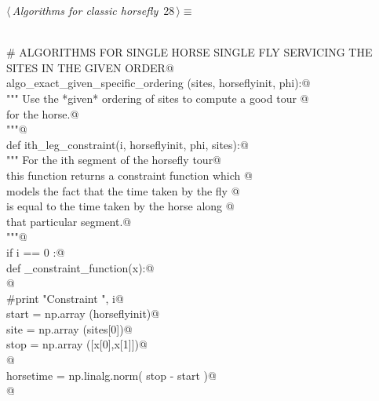 \documentclass[11.5pt]{report}
\begin{document}
\newchunk 

\begin{flushleft} \small\label{scrap32}\raggedright\small
{} $\langle\,${\itshape Algorithms for classic horsefly}\nobreak\ {\footnotesize {28}}$\,\rangle\equiv$
\vspace{-1ex}
\begin{list}{}{} \item
\mbox{}\verb@@\\
\mbox{}\verb@# ALGORITHMS FOR SINGLE HORSE SINGLE FLY SERVICING THE SITES IN THE GIVEN ORDER@\\
\mbox{}\verb@def algo_exact_given_specific_ordering (sites, horseflyinit, phi):@\\
\mbox{}\verb@    """ Use the *given* ordering of sites to compute a good tour @\\
\mbox{}\verb@    for the horse.@\\
\mbox{}\verb@    """@\\
\mbox{}\verb@    def ith_leg_constraint(i, horseflyinit, phi, sites):@\\
\mbox{}\verb@        """ For the ith segment of the horsefly tour@\\
\mbox{}\verb@        this function returns a constraint function which @\\
\mbox{}\verb@        models the fact that the time taken by the fly @\\
\mbox{}\verb@        is equal to the time taken by the horse along @\\
\mbox{}\verb@        that particular segment.@\\
\mbox{}\verb@        """@\\
\mbox{}\verb@        if i == 0 :@\\
\mbox{}\verb@            def _constraint_function(x):@\\
\mbox{}\verb@            @\\
\mbox{}\verb@                #print "Constraint  ", i@\\
\mbox{}\verb@                start = np.array (horseflyinit)@\\
\mbox{}\verb@                site  = np.array (sites[0])@\\
\mbox{}\verb@                stop  = np.array ([x[0],x[1]])@\\
\mbox{}\verb@            @\\
\mbox{}\verb@                horsetime = np.linalg.norm( stop - start )@\\
\mbox{}\verb@            @\\

\end{list}
\end{flushleft}
\end{document}
